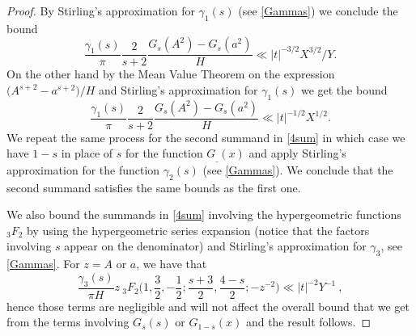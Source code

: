 \documentclass[a4paper,11pt]{amsart}
\theoremstyle{definition}
\begin{document}
\begin{proof}
By Stirling's approximation for $\gamma_1(s)$ (see \eqref{Gammas}) we conclude the bound
$$\frac{\gamma_1(s)}{\pi}\frac{2}{s+2}\frac{G_s(A^2)-G_s(a^2)}{H} \ll |t|^{-3/2}X^{3/2}/Y.$$
On the other hand by the Mean Value Theorem on the expression $\big(A^{s+2}-a^{s+2}\big)/{H}$ and Stirling's approximation for $\gamma_1(s)$ we get the bound 
$$\frac{\gamma_1(s)}{\pi}\frac{2}{s+2}\frac{G_s(A^2)-G_s(a^2)}{H} \ll |t|^{-1/2}X^{1/2}.$$
We repeat the same process for the second summand in \eqref{4sum} in which case we have $1-s$ in place of $s$ for the function $G_{\_}(x)$ and apply Stirling's approximation for the function $\gamma_2(s)$ (see \eqref{Gammas}). We conclude that the second summand satisfies the same bounds as the first one.






We also bound the summands in \eqref{4sum} involving the hypergeometric functions $_3F_2$ by using the hypergeometric series expansion (notice that the factors involving $s$ appear on the denominator) and Stirling's approximation for $\gamma_3$, see \eqref{Gammas}. For $z=A$ or $a$, we have that
$$\frac{\gamma_3(s)}{\pi H}z\: _3F_2\Big(1,\frac{3}{2},-\frac{1}{2};\frac{s+3}{2},\frac{4-s}{2};-z^{-2}\Big)\ll |t|^{-2}Y^{-1} \:, $$
hence those terms are negligible and will not affect the overall bound that we get from the terms involving $G_s(s)$ or $G_{1-s}(x)$ and the result follows.


\end{proof}
\end{document}

